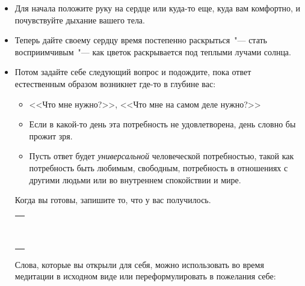 \vspace{3ex}

\begin{itemize}
	\item Для начала положите руку на сердце или куда-то еще, куда вам комфортно, и почувствуйте дыхание вашего тела.
	
	\item Теперь дайте своему сердцу время постепенно раскрыться~"--- стать восприимчивым~"--- как цветок раскрывается под теплыми лучами солнца.
	
	\item Потом задайте себе следующий вопрос и подождите, пока ответ естественным образом возникнет где-то в глубине вас:
	
	\begin{itemize}
		\item <<Что мне нужно?>>, <<Что мне на самом деле нужно?>>
		
		\item Если в какой-то день эта потребность не удовлетворена, день словно бы прожит зря.
		
		\item Пусть ответ будет \emph{универсальной} человеческой потребностью, такой как потребность быть любимым, свободным, потребность в отношениях с другими людьми или во внутреннем спокойствии и мире.
	\end{itemize}

	\itemWritingHand Когда вы готовы, запишите то, что у вас получилось.
	
	\setlength{\extrarowheight}{2mm}
	\begin{tabularx}{0.96\textwidth}{X}
		\\
		\arrayrulecolor{gray}\hline\\
		\hline\\
		\hline\\
		\hline\\
		\hline\\
		\hline\\
		\hline\\
		\hline\\
		\hline\\
		\hline\\
	\end{tabularx}
	\setlength{\extrarowheight}{0mm}
	\itemWritingHand Слова, которые вы открыли для себя, можно использовать во время медитации в исходном виде или переформулировать в пожелания себе:
	

\end{itemize}
